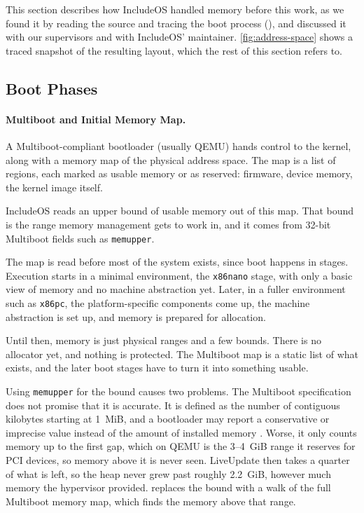\documentclass[12pt]{report}
\newcommand{\fullref}[1]{\Cref{#1}}
\renewcommand{\_}{\origunderscore\allowbreak}
\begin{document}
This section describes how IncludeOS handled memory before this work, as we found it by reading the source and tracing the boot process (\fullref{sec:analysis-method}), and discussed it with our supervisors and with IncludeOS' maintainer. \cref{fig:address-space} shows a traced snapshot of the resulting layout, which the rest of this section refers to.



\subsection{Boot Phases}

\paragraph{Multiboot and Initial Memory Map.}

A Multiboot-compliant bootloader (usually QEMU) hands control to the kernel, along with a memory map of the physical address space. The map is a list of regions, each marked as usable memory or as reserved: firmware, device memory, the kernel image itself.

IncludeOS reads an upper bound of usable memory out of this map. That bound is the range memory management gets to work in, and it comes from 32-bit Multiboot fields such as \texttt{mem\_upper}.

The map is read before most of the system exists, since boot happens in stages. Execution starts in a minimal environment, the \texttt{x86\_nano} stage, with only a basic view of memory and no machine abstraction yet. Later, in a fuller environment such as \texttt{x86\_pc}, the platform-specific components come up, the machine abstraction is set up, and memory is prepared for allocation.

Until then, memory is just physical ranges and a few bounds. There is no allocator yet, and nothing is protected. The Multiboot map is a static list of what exists, and the later boot stages have to turn it into something usable.

Using \texttt{mem\_upper} for the bound causes two problems. The Multiboot specification does not promise that it is accurate. It is defined as the number of contiguous kilobytes starting at 1~MiB, and a bootloader may report a conservative or imprecise value instead of the amount of installed memory \cite{multiboot-spec}. Worse, it only counts memory up to the first gap, which on QEMU is the 3--4~GiB range it reserves for PCI devices, so memory above it is never seen. LiveUpdate then takes a quarter of what is left, so the heap never grew past roughly 2.2~GiB, however much memory the hypervisor provided. \fullref{sec:design} replaces the bound with a walk of the full Multiboot memory map, which finds the memory above that range.
\end{document}
